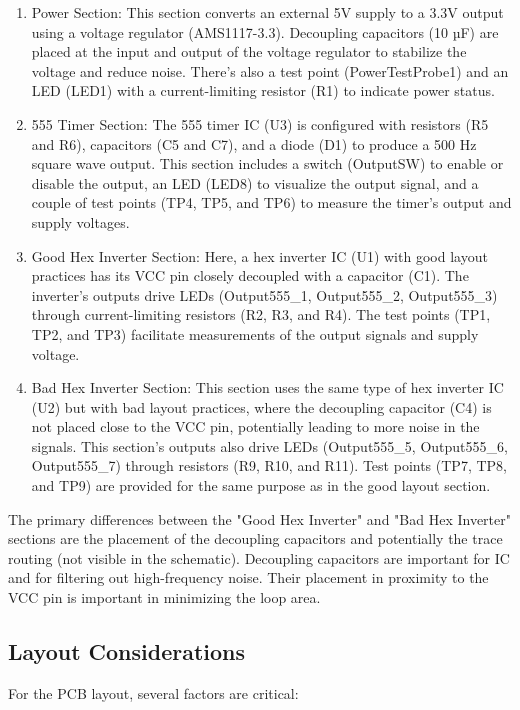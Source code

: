\documentclass[a4paper,11pt]{article}%
\begin{document}
\begin{enumerate}
	\item Power Section: This section converts an external 5V supply to a 3.3V output using a voltage regulator (AMS1117-3.3). Decoupling capacitors (10 µF) are placed at the input and output of the voltage regulator to stabilize the voltage and reduce noise. There's also a test point (PowerTestProbe1) and an LED (LED1) with a current-limiting resistor (R1) to indicate power status.
	\item 555 Timer Section: The 555 timer IC (U3) is configured with resistors (R5 and R6), capacitors (C5 and C7), and a diode (D1) to produce a 500 Hz square wave output. This section includes a switch (OutputSW) to enable or disable the output, an LED (LED8) to visualize the output signal, and a couple of test points (TP4, TP5, and TP6) to measure the timer's output and supply voltages.
	\item Good Hex Inverter Section: Here, a hex inverter IC (U1) with good layout practices has its VCC pin closely decoupled with a capacitor (C1). The inverter's outputs drive LEDs (Output555\_1, Output555\_2, Output555\_3) through current-limiting resistors (R2, R3, and R4). The test points (TP1, TP2, and TP3) facilitate measurements of the output signals and supply voltage.
	\item Bad Hex Inverter Section: This section uses the same type of hex inverter IC (U2) but with bad layout practices, where the decoupling capacitor (C4) is not placed close to the VCC pin, potentially leading to more noise in the signals. This section's outputs also drive LEDs (Output555\_5, Output555\_6, Output555\_7) through resistors (R9, R10, and R11). Test points (TP7, TP8, and TP9) are provided for the same purpose as in the good layout section.
	
\end{enumerate}
The primary differences between the "Good Hex Inverter" and "Bad Hex Inverter" sections are the placement of the decoupling capacitors and potentially the trace routing (not visible in the schematic). Decoupling capacitors are important for IC and for filtering out high-frequency noise. Their placement in proximity to the VCC pin is important in minimizing the loop area.



\subsection{Layout Considerations}
For the PCB layout, several factors are critical:
\end{document}

